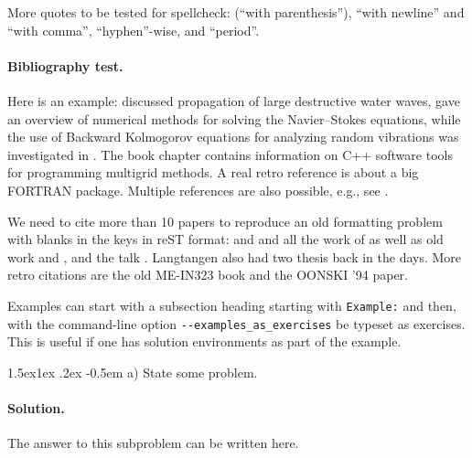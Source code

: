 \documentclass[%
oneside,                 %
final,                   %
10pt]{article}
\makeatletter
\newenvironment{doconceexercise}{}{}
\newcounter{doconceexercisecounter}
\newcommand\subex{\@startsection{paragraph}{4}{\z@}%
                  {1.5ex\@plus1ex \@minus.2ex}%
                  {-0.5em}%
                  {\normalfont\normalsize\bfseries}}
\theoremstyle{definition}
\makeatother
\begin{document}
\begin{enumerate}
More quotes to be tested for spellcheck:
(``with parenthesis''), ``with newline''
and ``with comma'', ``hyphen''-wise, and ``period''.

\paragraph{Bibliography test.}
Here is an example: \cite{Langtangen_Pedersen_2002} discussed propagation of
large destructive water waves, \cite{Langtangen_et_al_2002} gave
an overview of numerical methods for solving the Navier--Stokes equations,
while the use of Backward Kolmogorov equations for analyzing
random vibrations was investigated in \cite{Langtangen_1994a}.
The book chapter \cite{Mardal_et_al_2003a} contains information on
C++ software tools for programming multigrid methods. A real retro
reference is \cite{Langtangen_1988d} about a big FORTRAN package.
Multiple references are also possible, e.g., see
\cite{Langtangen_Pedersen_2002,Mardal_et_al_2003a}.

We need to cite more than 10 papers to reproduce an old formatting
problem with blanks in the keys in reST format:
\cite{Langtangen_1992c,Langtangen_1994a,Mortensen_et_al_2011,Langtangen_Pedersen_2002}
and
\cite{Langtangen_et_al_2002,Glimsdal_et_al_20006,Rahman_et_al_2006b,Haga_et_al_2011a,Langtangen_2003a,Langtangen_2008a,Langtangen:95}
and all the work of
\cite{Langtangen_2012,Mardal_et_al_2003a,Jeberg_et_al_2004} as well as
old work \cite{Langtangen_1988d} and \cite{Langtangen_1989e}, and the
talk \cite{Langtangen_talk_2007a}.
Langtangen also had two thesis \cite{Langtangen:85,Langtangen_1989e}
back in the days.
More retro citations are
the old ME-IN323 book \cite{Langtangen:91} and the
\cite{Langtangen:94b} OONSKI '94 paper.

\begin{doconceexercise}

                             
\label{Example}

Examples can start with a subsection heading starting with \texttt{Example:}
and then, with the command-line option \Verb!--examples_as_exercises! be
typeset as exercises. This is useful if one has solution
environments as part of the example.

\subex{a)}
State some problem.

\paragraph{Solution.}
The answer to this subproblem can be written here.


\end{doconceexercise}
\end{enumerate}
\end{document}
